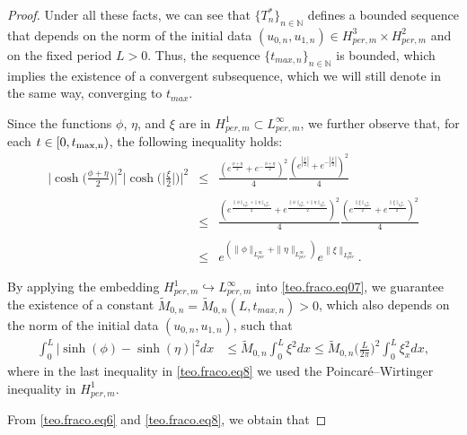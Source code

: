 \documentclass[12pt,reqno,a4paper]{amsart} %
\numberwithin{equation}{section}
\numberwithin{figure}{section}
\begin{document}
\begin{proof}
	 Under all these facts, we can see that $\{T^*_n\}_{n\in\mathbb{N}}$ defines a bounded sequence that depends on the norm of the initial data $(u_{0,n},u_{1,n}) \in H_{per,m}^3\times H_{per,m}^2$ and on the fixed period $L>0$. Thus, the sequence $\{t_{max,n}\}_{n\in \mathbb{N}}$ is bounded, which implies the existence of a convergent subsequence, which we will still denote in the same way, converging to $t_{max}$. 
 
Since the functions $\phi$, $\eta$, and $\xi$ are in $H_{per,m}^1\subset L_{per,m}^{\infty}$, we further observe that, for each $t\in[0, t_{\rm{max,n}})$, the following inequality holds:
 \begin{equation}\label{teo.fraco.eq07}\begin{array}{lllll}
\displaystyle\biggl|\cosh\biggl(\frac{\phi+\eta}{2} \biggl)\biggl| ^2\biggl| \cosh\biggl(\biggl|\frac{\xi}{2} \biggl| \biggl)\biggl| ^2 &\leq& \displaystyle\frac{(e^{\frac{\phi+\eta}{2}}+e^{-\frac{\phi+\eta}{2}})^2}{4} \frac{(e^{|\frac{\xi}{2} |}+e^{-|\frac{\xi}{2} |  })^2}{4}
\\\\ &\leq &  \displaystyle\frac{(e^{\frac{\|\phi\|_{L^\infty_{per}}+\|\eta\|_{L^\infty_{per}}}{2}}+e^{\frac{\|\phi\|_{L^\infty_{per}}+\|\eta\|_{L^\infty_{per}}}{2}})^2}{4} \frac{(e^{\frac{\|\xi\|_{L^\infty_{per}}}{2} }+e^{\frac{\|\xi\|_{L^\infty_{per}}}{2}  })^2}{4}
\\\\ &\leq &\displaystyle e^{(\|\phi\|_{L^\infty_{per}}+\|\eta\|_{L^\infty_{per}})}  e^{\|\xi\|_{L^\infty_{per}}}. 
 \end{array}\end{equation}

By applying the embedding  $H_{per,m}^1\hookrightarrow L_{per,m}^{\infty}$ into \eqref{teo.fraco.eq07}, we guarantee the existence of a constant $\tilde{M}_{0,n}= \tilde{M}_{0,n}(L, t_{max,n})>0$, which also depends on the norm of the initial data $(u_{0,n},u_{1,n})$, such that 
\begin{align}\label{teo.fraco.eq8}
	\int_0^L|\sinh(\phi)-\sinh(\eta)|^2dx&	\leq \tilde{M}_{0,n}
	\int_0^L\xi^2dx\leq \tilde{M}_{0,n} \biggl(\frac{L}{2\pi}\biggl)^2\int_0^L\xi_x^2dx, 
\end{align}where in the last inequality in \eqref{teo.fraco.eq8} we used the Poincaré–Wirtinger inequality in $H_{per,m}^1$.

From \eqref{teo.fraco.eq6} and \eqref{teo.fraco.eq8}, we obtain that


\end{proof}
\end{document}
